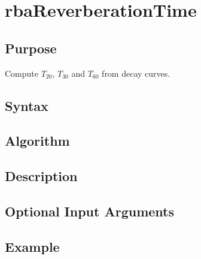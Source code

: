 
\chapter{rbaReverberationTime} %
\label{cha:rbaRevTime} %

\section{Purpose} %
\label{sec:rbaRevTime_purpose}
Compute $T_20$, $T_30$ and $T_60$ from decay curves.


\section{Syntax} %
\label{sec:rbaRevTime_syntax}



\section{Algorithm} %
\label{sec:rbaRevTime_algorithm}



\section{Description} %
\label{sec:rbaRevTime_description}



\section{Optional Input Arguments} %
\label{sec:rbaRevTime_optional_input_arguments}



\section{Example} %
\label{sec:rbaRevTime_example}


